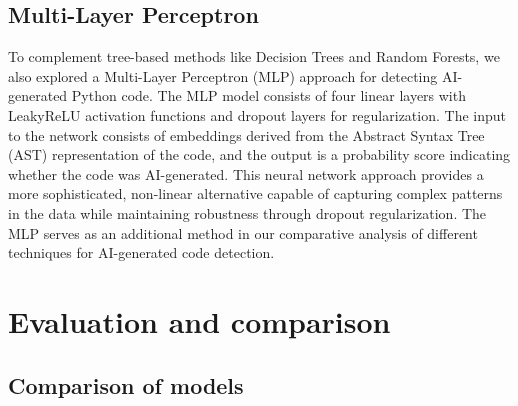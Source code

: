 \documentclass{article}
\begin{document}
\subsection{Multi-Layer Perceptron}
To complement tree-based methods like Decision Trees and Random Forests, we also explored a Multi-Layer Perceptron (MLP) approach for detecting AI-generated Python code. The MLP model consists of four linear layers with LeakyReLU activation functions and dropout layers for regularization. The input to the network consists of embeddings derived from the Abstract Syntax Tree (AST) representation of the code, and the output is a probability score indicating whether the code was AI-generated. This neural network approach provides a more sophisticated, non-linear alternative capable of capturing complex patterns in the data while maintaining robustness through dropout regularization. The MLP serves as an additional method in our comparative analysis of different techniques for AI-generated code detection.

\section{Evaluation and comparison}

\subsection{Comparison of models}
\end{document}

